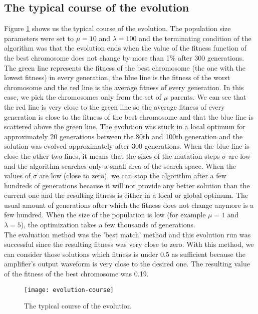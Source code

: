 \subsection{The typical course of the evolution}
Figure \ref{evolution-course} shows us the typical course of the evolution. The population size parameters were set to $\mu = 10$ and $\lambda = 100$ and the terminating condition of the algorithm was that the evolution ends when the value of the fitness function of the best chromosome does not change by more than 1\% after 300 generations.\\
The green line represents the fitness of the best chromosome (the one with the lowest fitness) in every generation, the blue line is the fitness of the worst chromosome and the red line is the average fitness of every generation. In this case, we pick the chromosomes only from the set of $\mu$ parents. We can see that the red line is very close to the green line so the average fitness of every generation is close to the fitness of the best chromosome and that the blue line is scattered above the green line. The evolution was stuck in a local optimum for approximately 20 generations between the 80th and 100th generation and the solution was evolved approximately after 300 generations. When the blue line is close the other two lines, it means that the sizes of the mutation steps $\sigma$ are low and the algorithm searches only a small area of the search space. When the values of $\sigma$ are low (close to zero), we can stop the algorithm after a few hundreds of generations because it will not provide any better solution than the current one and the resulting fitness is either in a local or global optimum. The usual amount of generations after which the fitness does not change anymore is a few hundred. When the size of the population is low (for example $\mu = 1$ and $\lambda = 5$), the optimization takes a few thousands of generations.\\
The evaluation method was the 'best match' method and this evolution run was successful since the resulting fitness was very close to zero. With this method, we can consider those solutions which fitness is under 0.5 as sufficient because the amplifier's output waveform is very close to the desired one. The resulting value of the fitness of the best chromosome was 0.19.

\begin{figure}[H]
    \centerline{\texttt{[image: evolution-course]}\label{evolution-course}}
    \caption{The typical course of the evolution}
\end{figure}


